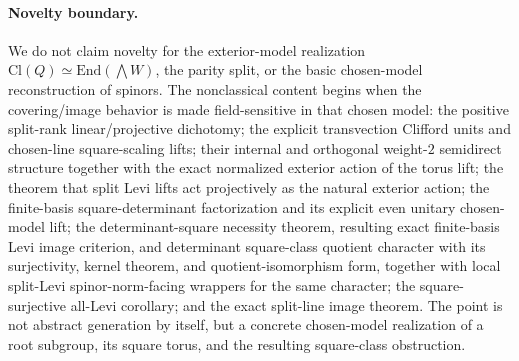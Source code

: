 \documentclass{birkjour}
\theoremstyle{plain}
\theoremstyle{definition}
\theoremstyle{remark}
\newcommand{\Cl}{\mathrm{Cl}}
\newcommand{\End}{\mathrm{End}}
\begin{document}
\paragraph{Novelty boundary.} We do not claim novelty for the exterior-model
realization $\Cl(Q)\simeq\End(\bigwedge W)$, the parity split, or the basic
chosen-model reconstruction of spinors. The nonclassical content begins when the
covering/image behavior is made field-sensitive in that chosen model: the
positive split-rank linear/projective dichotomy; the explicit transvection
Clifford units and chosen-line square-scaling lifts; their internal and
orthogonal weight-$2$
semidirect structure together with the exact normalized exterior action of the
torus lift; the theorem that split Levi lifts act projectively as the natural
exterior action; the finite-basis square-determinant factorization and its
explicit even unitary chosen-model lift; the determinant-square necessity
theorem, resulting exact finite-basis Levi image criterion, and determinant
square-class quotient character with its surjectivity, kernel theorem, and quotient-isomorphism
form, together with local split-Levi spinor-norm-facing wrappers for the same
character; the
square-surjective all-Levi corollary; and the exact split-line image theorem.
The point is not abstract generation by itself,
but a concrete chosen-model realization of a root subgroup, its square torus,
and the resulting square-class obstruction.
\end{document}
